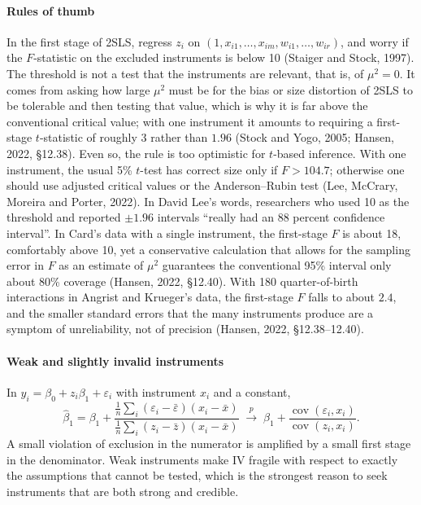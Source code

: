 \documentclass[11pt,a4paper]{article}
\newcommand{\Cov}{\operatorname{cov}}
\newcommand{\cp}{\xrightarrow{\;p\;}}
\begin{document}
\paragraph{Rules of thumb}
In the first stage of 2SLS, regress $z_i$ on $(1,x_{i1},\dots,x_{im},w_{i1},\dots,w_{ir})$, and worry if the $F$-statistic on the excluded instruments is below 10 (Staiger and Stock, 1997). The threshold is not a test that the instruments are relevant, that is, of $\mu^2=0$. It comes from asking how large $\mu^2$ must be for the bias or size distortion of 2SLS to be tolerable and then testing that value, which is why it is far above the conventional critical value; with one instrument it amounts to requiring a first-stage $t$-statistic of roughly 3 rather than $1.96$ (Stock and Yogo, 2005; Hansen, 2022, \S12.38). Even so, the rule is too optimistic for $t$-based inference. With one instrument, the usual 5\% $t$-test has correct size only if $F>104.7$; otherwise one should use adjusted critical values or the Anderson--Rubin test (Lee, McCrary, Moreira and Porter, 2022). In David Lee's words, researchers who used 10 as the threshold and reported $\pm1.96$ intervals ``really had an 88 percent confidence interval''. In Card's data with a single instrument, the first-stage $F$ is about 18, comfortably above 10, yet a conservative calculation that allows for the sampling error in $F$ as an estimate of $\mu^2$ guarantees the conventional 95\% interval only about 80\% coverage (Hansen, 2022, \S12.40). With 180 quarter-of-birth interactions in Angrist and Krueger's data, the first-stage $F$ falls to about $2.4$, and the smaller standard errors that the many instruments produce are a symptom of unreliability, not of precision (Hansen, 2022, \S12.38--12.40).

\paragraph{Weak and slightly invalid instruments}
In $y_i=\beta_0+z_i\beta_1+\varepsilon_i$ with instrument $x_i$ and a constant,
\[
\hat\beta_1=\beta_1+\frac{\frac1n\sum_i(\varepsilon_i-\bar\varepsilon)(x_i-\bar x)}{\frac1n\sum_i(z_i-\bar z)(x_i-\bar x)}\;\cp\;\beta_1+\frac{\Cov(\varepsilon_i,x_i)}{\Cov(z_i,x_i)} .
\]
A small violation of exclusion in the numerator is amplified by a small first stage in the denominator. Weak instruments make IV fragile with respect to exactly the assumptions that cannot be tested, which is the strongest reason to seek instruments that are both strong and credible.
\end{document}
